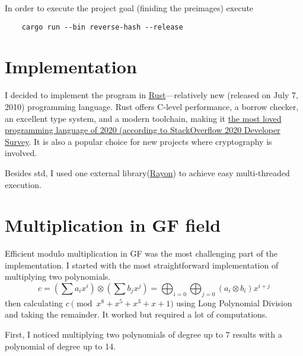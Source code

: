 \documentclass[runningheads,a4paper]{llncs}
\begin{document}
In order to execute the project goal (finiding the preimages) execute
\begin{verbatim}
    cargo run --bin reverse-hash --release
\end{verbatim}

\section{Implementation}
I decided to implement the program in \href{https://en.wikipedia.org/wiki/Rust_(programming_language)}{Rust}—relatively new (released on July 7, 2010) programming language. Rust offers C-level performance, a borrow checker, an excellent type system, and a modern toolchain, making it \href{https://insights.stackoverflow.com/survey/2020#most-loved-dreaded-and-wanted}{the most loved programming language of 2020 (according to StackOverflow 2020 Developer Survey}. It is also a popular choice for new projects where cryptography is involved.

Besides std, I used one external library(\href{https://github.com/rayon-rs/rayon}{Rayon}) to achieve easy multi-threaded execution.

\section{Multiplication in GF field}
Efficient modulo multiplication in GF was the most challenging part of the implementation.
I started with the most straightforward implementation of multiplying two polynomials.  
\[
c = (\sum{a_i x^i}) \otimes (\sum{b_j x^j}) = \bigoplus_{i=0}\bigoplus_{j=0} (a_i \otimes b_i) x^{i+j}
\]
then calculating $c \pmod{x^8 + x^5 + x^3 + x + 1}$ using Long Polynomial Division and taking the remainder. It worked but required a lot of computations.

First, I noticed multiplying two polynomials of degree up to 7 results with a polynomial of degree up to 14.
\end{document}
